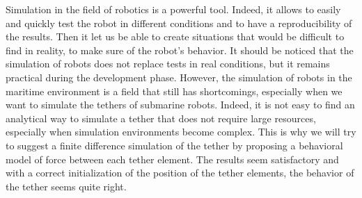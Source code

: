 Simulation in the field of robotics is a powerful tool. Indeed, it allows to easily and quickly test the robot in different conditions and to have a reproducibility of the results. Then it let us be able to create situations that would be difficult to find in reality, to make sure of the robot's behavior. It should be noticed that the simulation of robots does not replace tests in real conditions, but it remains practical during the development phase. However, the simulation of robots in the maritime environment is a field that still has shortcomings, especially when we want to simulate the tethers of submarine robots. Indeed, it is not easy to find an analytical way to simulate a tether that does not require large resources, especially when simulation environments become complex. This is why we will try to suggest a finite difference simulation of the tether by proposing a behavioral model of force between each tether element. The results seem satisfactory and with a correct initialization of the position of the tether elements, the behavior of the tether seems quite right.